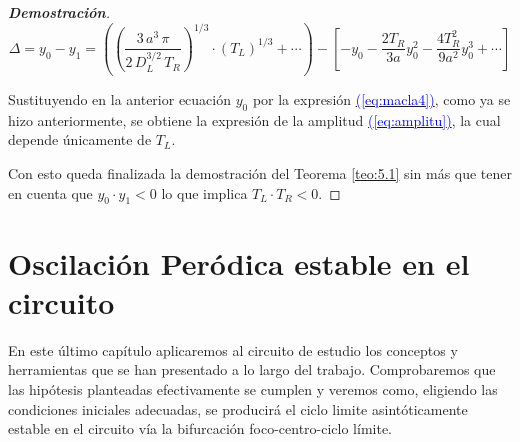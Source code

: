 \documentclass[12pt,a4paper]{report} %
\newcommand{\eref}[1]{\hyperref[#1]{\textcolor{blue}{(\ref*{#1})}}}
\begin{document}
\begin{proof}[\textbf{Demostración}]
	\begin{equation}
		\varDelta=y_0-y_1=\left( \left( \frac{3\, a^3 \, \pi}{2\, D_L^{3/2}\, T_R} \right)^{1/3}\cdot \left(T_L\right)^{1/3}+\cdots \right) - \left[ -y_0-\frac{2T_R}{3a}y_0^2-\frac{4T_R^2}{9a^2}y_0^3+\cdots \right]
	\end{equation}\smallskip
	
	\noindent Sustituyendo en la anterior ecuación $y_0$ por la expresión \eref{eq:macla4}, como ya se hizo anteriormente, se obtiene la expresión de la amplitud \eref{eq:amplitu}, la cual depende únicamente de $T_L$.
	

\vspace{0.5cm} Con esto queda finalizada la demostración del Teorema \ref{teo:5.1} sin más que tener en cuenta que $y_0\cdot y_1<0$ lo que implica $T_L\cdot T_R<0$.

\end{proof}
	
	\newpage
	
	\chapter{Oscilación Peródica estable en el circuito}
	\label{cap.55}
	
	En este último capítulo aplicaremos al circuito de estudio los conceptos y herramientas que se han presentado a lo largo del trabajo. Comprobaremos que las hipótesis planteadas efectivamente se cumplen y veremos como, eligiendo las condiciones iniciales adecuadas, se producirá el ciclo limite asintóticamente estable en el circuito vía la bifurcación foco-centro-ciclo límite.
	
\end{document}
